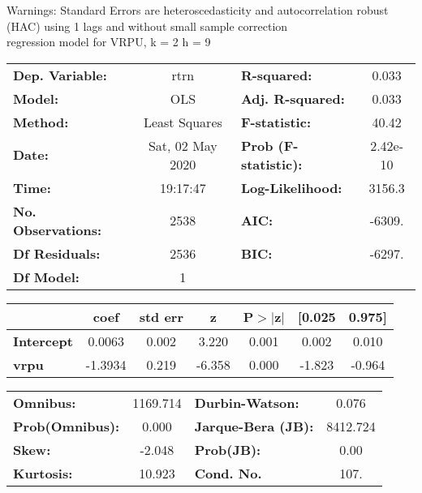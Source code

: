Warnings: \newline
 [1] Standard Errors are heteroscedasticity and autocorrelation robust (HAC) using 1 lags and without small sample correction\\ 

regression model for VRPU, k = 2 h = 9\begin{center}
\begin{tabular}{lclc}
\toprule
\textbf{Dep. Variable:}    &       rtrn       & \textbf{  R-squared:         } &     0.033   \\
\textbf{Model:}            &       OLS        & \textbf{  Adj. R-squared:    } &     0.033   \\
\textbf{Method:}           &  Least Squares   & \textbf{  F-statistic:       } &     40.42   \\
\textbf{Date:}             & Sat, 02 May 2020 & \textbf{  Prob (F-statistic):} &  2.42e-10   \\
\textbf{Time:}             &     19:17:47     & \textbf{  Log-Likelihood:    } &    3156.3   \\
\textbf{No. Observations:} &        2538      & \textbf{  AIC:               } &    -6309.   \\
\textbf{Df Residuals:}     &        2536      & \textbf{  BIC:               } &    -6297.   \\
\textbf{Df Model:}         &           1      & \textbf{                     } &             \\
\bottomrule
\end{tabular}
\begin{tabular}{lcccccc}
                   & \textbf{coef} & \textbf{std err} & \textbf{z} & \textbf{P$> |$z$|$} & \textbf{[0.025} & \textbf{0.975]}  \\
\midrule
\textbf{Intercept} &       0.0063  &        0.002     &     3.220  &         0.001        &        0.002    &        0.010     \\
\textbf{vrpu}      &      -1.3934  &        0.219     &    -6.358  &         0.000        &       -1.823    &       -0.964     \\
\bottomrule
\end{tabular}
\begin{tabular}{lclc}
\textbf{Omnibus:}       & 1169.714 & \textbf{  Durbin-Watson:     } &    0.076  \\
\textbf{Prob(Omnibus):} &   0.000  & \textbf{  Jarque-Bera (JB):  } & 8412.724  \\
\textbf{Skew:}          &  -2.048  & \textbf{  Prob(JB):          } &     0.00  \\
\textbf{Kurtosis:}      &  10.923  & \textbf{  Cond. No.          } &     107.  \\
\bottomrule
\end{tabular}
\end{center}

